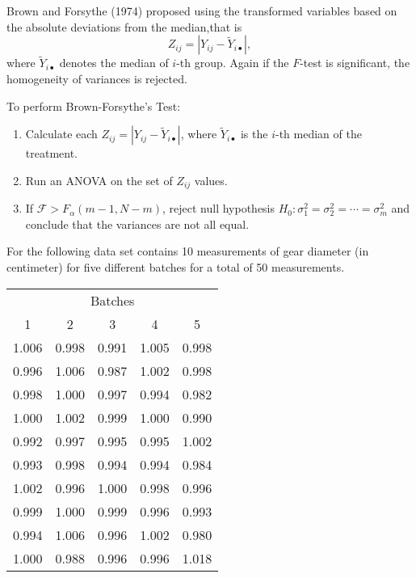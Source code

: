  Brown and Forsythe (1974) proposed using the transformed variables based
 on the absolute deviations from the median,that is 
 \begin{equation}
    Z_{ij} = |Y_{ij} - \widetilde{Y}_{i \bullet}|,
 \end{equation}
 where $\widetilde{Y}_{i \bullet}$ denotes the median of $i$-th group. Again if the $F$-test is 
 significant, the homogeneity of variances is rejected.

\begin{definition}
    To perform Brown-Forsythe's Test:
    \begin{enumerate}
        \item Calculate each $Z_{ij} = |Y_{ij} - \widetilde{Y}_{i \bullet}|$, 
            where $\widetilde{Y}_{i \bullet}$ is the $i$-th median of the treatment.
        \item Run an ANOVA on the set of $Z_{ij}$ values.
        \item If $\mathcal{F} > F_{\alpha}(m - 1, N-m)$, reject null hypothesis 
        $H_0 : \sigma^2_1 = \sigma^2_2 = \cdots = \sigma^2_m$ and conclude that 
        the variances are not all equal.
    \end{enumerate}
\end{definition}

\begin{example}
    For the following data set contains 10 measurements of gear diameter (in centimeter)
    for five different batches for a total of 50 measurements.

    \begin{table}[!htbp]
        \centering
        \begin{tabular}{ccccc}
            \toprule
            \multicolumn{5}{c}{Batches}\\[0.5em]
            1 & 2 & 3 & 4 & 5\\
            \midrule
            1.006 & 0.998 & 0.991 & 1.005 & 0.998\\
            0.996 & 1.006 & 0.987 & 1.002 & 0.998\\
            0.998 & 1.000 & 0.997 & 0.994 & 0.982\\
            1.000 & 1.002 & 0.999 & 1.000 & 0.990\\
            0.992 & 0.997 & 0.995 & 0.995 & 1.002\\
            0.993 & 0.998 & 0.994 & 0.994 & 0.984\\
            1.002 & 0.996 & 1.000 & 0.998 & 0.996\\
            0.999 & 1.000 & 0.999 & 0.996 & 0.993\\
            0.994 & 1.006 & 0.996 & 1.002 & 0.980\\
            1.000 & 0.988 & 0.996 & 0.996 & 1.018\\
            \bottomrule
        \end{tabular}
    \end{table}

\end{example}

